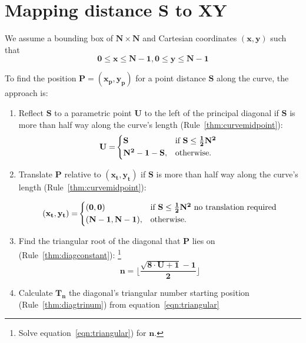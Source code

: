 \documentclass[10pt]{article}
\theoremstyle{theorem}
\begin{document}

\section{Mapping distance S to XY}

We assume a bounding box of $\mathbf{N \times N}$ and Cartesian coordinates
$\mathbf{(x, y)}$ such that
\[
  \mathbf{0 \leq x \leq N-1, 0 \leq y \leq N-1}
\]

To find the position $\mathbf{P=(x_p,y_p)}$ for a point distance $\mathbf{S}$
along the curve, the approach is:
\begin{enumerate}
  \item Reflect $\mathbf{S}$ to a parametric point $\mathbf{U}$ to the left of
    the principal diagonal if $\mathbf{S}$ is more than half way along the
    curve's length (Rule~\ref{thm:curvemidpoint}):
    \begin{align}
      \mathbf{U =}
      \begin{cases*}
        \mathbf{S} & if $\mathbf{S \leq \frac{1}{2} N^2}$ \\
        \mathbf{N^2-1-S}, & otherwise. \\
      \end{cases*} \notag
    \end{align}

  \item Translate $\mathbf{P}$ relative to $\mathbf{(x_t, y_t)}$ if
    $\mathbf{S}$ is more than half way along the curve's length
    (Rule~\ref{thm:curvemidpoint}):

    \begin{align}
      \mathbf{(x_t, y_t) =}
      \begin{cases*}
        \mathbf{(0, 0)} & if $\mathbf{S \leq \frac{1}{2} N^2}$ no translation
        required\\
        \mathbf{(N-1, N-1)}, & otherwise.\\
      \end{cases*} \notag
    \end{align}

  \item Find the triangular root of the diagonal that $\mathbf{P}$ lies on
    (Rule~\ref{thm:diagconstant}):
    \footnote{Solve equation~\ref{eqn:triangular}) for $\mathbf{n}$.}
  \[
    \mathbf{n=\Bigg \lfloor \frac{\sqrt{8 \cdot U+1}-1}{2} \Bigg \rfloor}
  \]

  \item Calculate $\mathbf{T_n}$ the diagonal's triangular number starting
    position (Rule~\ref{thm:diagtrinum}) from equation~\ref{eqn:triangular}


\end{enumerate}
\end{document}
